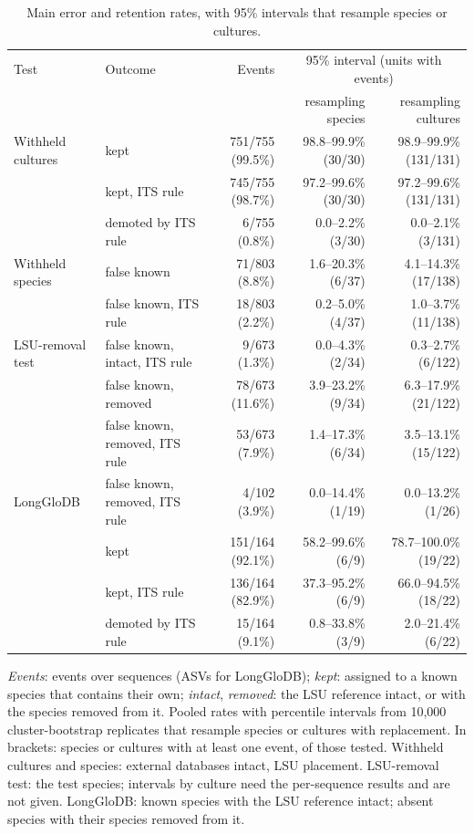 \begin{table}[htbp]\centering
\begin{threeparttable}
\caption{Main error and retention rates, with 95\% intervals that resample species or cultures.}
\label{tab:intervals}
\footnotesize\setlength{\tabcolsep}{2pt}
\begin{tabular}{llrrr}
\toprule
Test & Outcome & Events & \multicolumn{2}{c}{95\% interval (units with events)}\\
 & & & resampling species & resampling cultures\\
\midrule
Withheld cultures & kept & 751/755 (99.5\%) & 98.8--99.9\% (30/30) & 98.9--99.9\% (131/131)\\
 & kept, ITS rule & 745/755 (98.7\%) & 97.2--99.6\% (30/30) & 97.2--99.6\% (131/131)\\
 & demoted by ITS rule & 6/755 (0.8\%) & 0.0--2.2\% (3/30) & 0.0--2.1\% (3/131)\\
Withheld species & false known & 71/803 (8.8\%) & 1.6--20.3\% (6/37) & 4.1--14.3\% (17/138)\\
 & false known, ITS rule & 18/803 (2.2\%) & 0.2--5.0\% (4/37) & 1.0--3.7\% (11/138)\\
LSU-removal test & false known, intact, ITS rule & 9/673 (1.3\%) & 0.0--4.3\% (2/34) & 0.3--2.7\% (6/122)\\
 & false known, removed & 78/673 (11.6\%) & 3.9--23.2\% (9/34) & 6.3--17.9\% (21/122)\\
 & false known, removed, ITS rule & 53/673 (7.9\%) & 1.4--17.3\% (6/34) & 3.5--13.1\% (15/122)\\
LongGloDB & false known, removed, ITS rule & 4/102 (3.9\%) & 0.0--14.4\% (1/19) & 0.0--13.2\% (1/26)\\
 & kept & 151/164 (92.1\%) & 58.2--99.6\% (6/9) & 78.7--100.0\% (19/22)\\
 & kept, ITS rule & 136/164 (82.9\%) & 37.3--95.2\% (6/9) & 66.0--94.5\% (18/22)\\
 & demoted by ITS rule & 15/164 (9.1\%) & 0.8--33.8\% (3/9) & 2.0--21.4\% (6/22)\\
\bottomrule
\end{tabular}
\begin{tablenotes}\footnotesize
\item \emph{Events}: events over sequences (ASVs for LongGloDB); \emph{kept}: assigned to a known species that contains their own;
\emph{intact}, \emph{removed}: the LSU reference intact, or with the species removed from it. Pooled rates with percentile intervals from 10,000 cluster-bootstrap replicates
that resample species or cultures with replacement. In brackets: species or cultures with at least one event, of those tested. Withheld cultures and species: external databases intact, LSU placement. LSU-removal test: the
test species; intervals by culture need the per-sequence results and are not given. LongGloDB: known species with the LSU
reference intact; absent species with their species removed from it.
\end{tablenotes}
\end{threeparttable}
\end{table}
